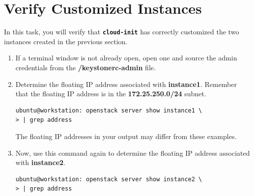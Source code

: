 \documentclass[letterpaper, 12pt]{article}
\begin{document}
\section{Verify Customized Instances}
\label{sec:verify_customized_instances}
In this task, you will verify that \textbf{\texttt{cloud-init}} has correctly customized the two instances created in the
previous section.

\begin{enumerate}
    \item If a terminal window is not already open, open one and source the admin credentials from the 
    \textbf{\texttildemid/keystonerc-admin} file.

    \item Determine the floating IP address associated with \textbf{instance1}. Remember that the floating IP address is
    in the \textbf{172.25.250.0/24} subnet.
\begin{lstlisting}
ubuntu@workstation: openstack server show instance1 \
> | grep address
\end{lstlisting}

    \begin{notebox}{}
        The floating IP addresses in your output may differ from these examples.
    \end{notebox}

    \item Now, use this command again to determine the floating IP address associated with \textbf{instance2}.
\begin{lstlisting}
ubuntu@workstation: openstack server show instance2 \
> | grep address
\end{lstlisting}



\end{enumerate}
\end{document}
